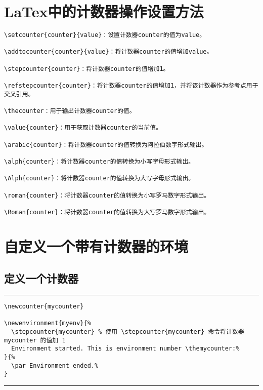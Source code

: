 \documentclass[12pt]{article}
\newcommand{\hl}{\noindent\rule{1\linewidth}{.1em}}
\begin{document}
\section{LaTex中的计数器操作设置方法}
\begin{verbatim}
\setcounter{counter}{value}：设置计数器counter的值为value。

\addtocounter{counter}{value}：将计数器counter的值增加value。

\stepcounter{counter}：将计数器counter的值增加1。

\refstepcounter{counter}：将计数器counter的值增加1，并将该计数器作为参考点用于交叉引用。

\thecounter：用于输出计数器counter的值。

\value{counter}：用于获取计数器counter的当前值。

\arabic{counter}：将计数器counter的值转换为阿拉伯数字形式输出。

\alph{counter}：将计数器counter的值转换为小写字母形式输出。

\Alph{counter}：将计数器counter的值转换为大写字母形式输出。

\roman{counter}：将计数器counter的值转换为小写罗马数字形式输出。

\Roman{counter}：将计数器counter的值转换为大写罗马数字形式输出。
\end{verbatim}




\section{自定义一个带有计数器的环境}


\newenvironment{myenv}{%
  \stepcounter{mycounter} %
  Environment started. This is environment number \themycounter:%
}{%
  \par Environment ended.%
}

\subsection{定义一个计数器}
\hl
\begin{verbatim}
\newcounter{mycounter}

\newenvironment{myenv}{%
  \stepcounter{mycounter} % 使用 \stepcounter{mycounter} 命令将计数器 mycounter 的值加 1
  Environment started. This is environment number \themycounter:%
}{%
  \par Environment ended.%
}
\end{verbatim}
\hl
\end{document}
